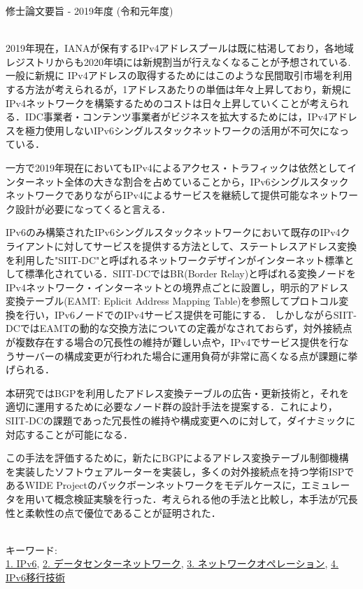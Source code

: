 修士論文要旨 - 2019年度 (令和元年度)
\begin{center}
\begin{large}
\end{large}
\end{center}

~ \\

2019年現在，IANAが保有するIPv4アドレスプールは既に枯渇しており，各地域レジストリからも2020年頃には新規割当が行えなくなることが予想されている.
一般に新規に IPv4アドレスの取得するためにはこのような民間取引市場を利用する方法が考えられるが，1アドレスあたりの単価は年々上昇しており，新規にIPv4ネットワークを構築するためのコストは日々上昇していくことが考えられる．IDC事業者・コンテンツ事業者がビジネスを拡大するためには，IPv4アドレスを極力使用しないIPv6シングルスタックネットワークの活用が不可欠になっている．

一方で2019年現在においてもIPv4によるアクセス・トラフィックは依然としてインターネット全体の大きな割合を占めていることから，IPv6シングルスタックネットワークでありながらIPv4によるサービスを継続して提供可能なネットワーク設計が必要になってくると言える．


IPv6のみ構築されたIPv6シングルスタックネットワークにおいて既存のIPv4クライアントに対してサービスを提供する方法として、ステートレスアドレス変換を利用した"SIIT-DC"と呼ばれるネットワークデザインがインターネット標準として標準化されている．SIIT-DCではBR(Border Relay)と呼ばれる変換ノードをIPv4ネットワーク・インターネットとの境界点ごとに設置し，明示的アドレス変換テーブル(EAMT: Eplicit Address Mapping Table)を参照してプロトコル変換を行い，IPv6ノードでのIPv4サービス提供を可能にする．
しかしながらSIIT-DCではEAMTの動的な交換方法についての定義がなされておらず，対外接続点が複数存在する場合の冗長性の維持が難しい点や，IPv4でサービス提供を行なうサーバーの構成変更が行われた場合に運用負荷が非常に高くなる点が課題に挙げられる．

本研究ではBGPを利用したアドレス変換テーブルの広告・更新技術と，それを適切に運用するために必要なノード群の設計手法を提案する．これにより，SIIT-DCの課題であった冗長性の維持や構成変更へのに対して，ダイナミックに対応することが可能になる．

この手法を評価するために，新たにBGPによるアドレス変換テーブル制御機構を実装したソフトウェアルーターを実装し，多くの対外接続点を持つ学術ISPであるWIDE Projectのバックボーンネットワークをモデルケースに，エミュレータを用いて概念検証実験を行った．考えられる他の手法と比較し，本手法が冗長性と柔軟性の点で優位であることが証明された．







~ \\
キーワード:\\
\underline{1. IPv6},
\underline{2. データセンターネットワーク},
\underline{3. ネットワークオペレーション},
\underline{4. IPv6移行技術}
\begin{flushright}
\dept \\
\author
\end{flushright}
